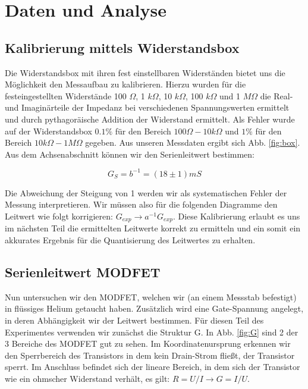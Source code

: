 \documentclass[aps,twocolumn,secnumarabic,nobalancelastpage,amsmath,amssymb,
nofootinbib,superscriptaddress]{revtex4-1}
\begin{document}
\section{Daten und Analyse}
\subsection{Kalibrierung mittels Widerstandsbox}
Die Widerstandsbox mit ihren fest einstellbaren Widerständen bietet uns die
Möglichkeit den Messaufbau zu kalibrieren. Hierzu wurden für die festeingestellten
Widerstände 100 $\Omega$, 1 $k\Omega$, 10 $k\Omega$, 100 $k\Omega$ und 1 $M\Omega$
die Real- und Imaginärteile der Impedanz bei verschiedenen Spannungswerten ermittelt
und durch pythagoräische Addition der Widerstand ermittelt. Als Fehler wurde auf der
Widerstandsbox $0.1\%$ für den Bereich $100\Omega - 10k\Omega$ und $1\%$ für den
Bereich $10k\Omega - 1M\Omega$ gegeben. Aus unseren Messdaten ergibt sich Abb.
\ref{fig:box}. Aus dem Achsenabschnitt können wir den Serienleitwert bestimmen:

  \begin{equation}
    G_S = b^{-1} = (18 \pm 1) mS
  \end{equation}

Die Abweichung der Steigung von 1 werden wir als systematischen Fehler der Messung
interpretieren. Wir müssen also für die folgenden Diagramme den Leitwert wie folgt
korrigieren: $G_{exp} \rightarrow a^{-1} G_{exp}$. Diese Kalibrierung erlaubt es
uns im nächsten Teil die ermittelten Leitwerte korrekt zu ermitteln und ein somit
ein akkurates Ergebnis für die Quantisierung des Leitwertes zu erhalten.


\subsection{Serienleitwert MODFET}
Nun untersuchen wir den MODFET, welchen wir (an einem Messstab befestigt) in
flüssiges Helium getaucht haben. Zusätzlich wird eine Gate-Spannung angelegt,
in deren Abhängigkeit wir der Leitwert bestimmen. Für diesen Teil des Experimentes
verwenden wir zunächst die Struktur G. In Abb. \ref{fig:G} sind 2 der 3 Bereiche
des MODFET gut zu sehen. Im Koordinatenursprung erkennen wir den Sperrbereich des
Transistors in dem kein Drain-Strom fließt, der Transistor sperrt. Im Anschluss
befindet sich der lineare Bereich, in dem sich der Transistor wie ein ohmscher
Widerstand verhält, es gilt: $R = U/I \rightarrow G = I/U$.
\end{document}
